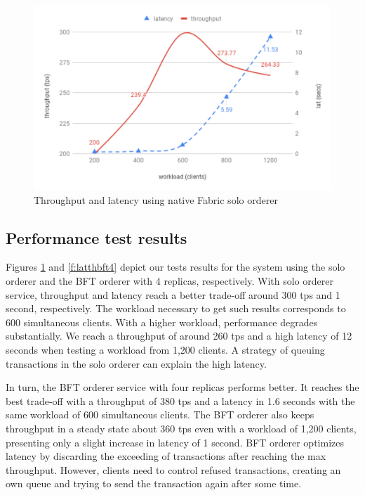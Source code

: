 \documentclass[journal]{IEEEtran}
\begin{document}

\begin{figure}[!t]
\centering
\includegraphics[width=.45\textwidth]{chartsolo} %
\caption{Throughput and latency using native Fabric solo orderer}
\label{f:latth}
\end{figure}


\subsection{Performance test results}
Figures \ref{f:latth} and \ref{f:latthbft4} depict our tests results for the system using the solo orderer and the BFT orderer with 4 replicas, respectively.
With solo orderer service, throughput and latency reach a better trade-off around 300 tps and 1 second, respectively.
The workload necessary to get such results corresponds to 600 simultaneous clients.
With a higher workload, performance degrades substantially.
We reach a throughput of around 260 tps and a high latency of 12 seconds when testing a workload from 1,200 clients.
A strategy of queuing transactions in the solo orderer can explain the high latency.

In turn, the BFT orderer service with four replicas performs better.
It reaches the best trade-off with a throughput of 380 tps and a latency in 1.6 seconds with the same workload of 600 simultaneous clients.
The BFT orderer also keeps throughput in a steady state about 360 tps even with a workload of 1,200 clients, presenting only a slight increase in latency of 1 second.
BFT orderer optimizes latency by discarding the exceeding of transactions after reaching the max throughput.
However, clients need to control refused transactions, creating an own queue and trying to send the transaction again after some time.
\end{document}
